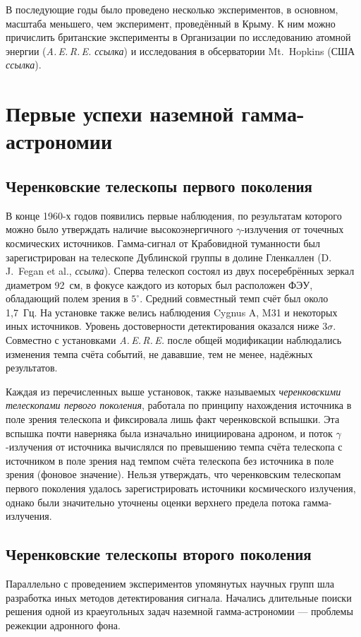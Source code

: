 \documentclass[magd,floatypics,numeref]{msudipl} %
\begin{document}
В последующие годы было проведено несколько экспериментов, в основном, масштаба меньшего, чем эксперимент, проведённый в Крыму. К ним можно причислить британские эксперименты в Организации по исследованию атомной энергии (\textit{A.\,E.\,R.\,E.  ссылка}) и исследования в обсерватории Mt.~Hopkins (США \textit{ссылка}).

\section{Первые успехи наземной гамма-астрономии}
\subsection{Черенковские телескопы первого поколения}
В конце 1960-х годов появились первые наблюдения, по результатам которого можно было утверждать наличие высокоэнергичного $\gamma$-излучения от точечных космических источников. Гамма-сигнал от Крабовидной туманности был зарегистрирован на телескопе Дублинской группы в долине Гленкаллен (D.\,J.~Fegan et al., \textit{ссылка}). Сперва телескоп состоял из двух посеребрённых зеркал диаметром 92~см, в фокусе каждого из которых был расположен ФЭУ, обладающий полем зрения в $5^{\circ}$. Средний совместный темп счёт был около 1,7~Гц. На установке также велись наблюдения Cygnus A, M31 и некоторых иных источников. Уровень достоверности детектирования оказался ниже $3\sigma$. Совместно с установками \textit{A.\,E.\,R.\,E.} после общей модификации наблюдались изменения темпа счёта событий, не дававшие, тем не менее, надёжных результатов. 

Каждая из перечисленных выше установок, также называемых \textit{черенковскими телескопами первого поколения}, работала по принципу нахождения источника в поле зрения телескопа и фиксировала лишь факт черенковской вспышки. Эта вспышка почти наверняка была изначально инициирована адроном, и поток $\gamma$-излучения от источника вычислялся по превышению темпа счёта телескопа с источником в поле зрения над темпом счёта телескопа без источника в поле зрения (фоновое значение).  Нельзя утверждать, что черенковским телескопам первого поколения удалось зарегистрировать источники космического излучения, однако были значительно уточнены оценки верхнего предела потока гамма-излучения.
\subsection{Черенковские телескопы второго поколения}
Параллельно с проведением экспериментов упомянутых научных групп шла разработка иных методов детектирования сигнала. Начались длительные поиски решения одной из краеугольных задач наземной гамма-астрономии --- проблемы режекции адронного фона. 
\end{document}
